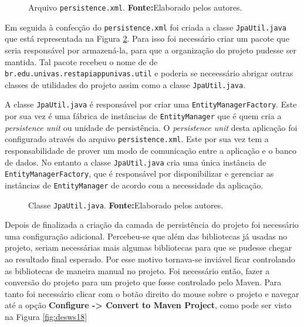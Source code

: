 	\begin{figure}[h!]
		
		\caption[Arquivo persistence.xml]{Arquivo \texttt{persistence.xml}.
		\textbf{Fonte:}Elaborado pelos autores.}
		\label{fig:desws16}
	\end{figure}
	
	\pagebreak
	
	\par Em seguida à confecção do \texttt{persistence.xml} foi criada a
classe \texttt{JpaUtil.java} que está representada na Figura \ref{fig:desws17}.
Para isso foi necessário criar um pacote que seria responsável por armazená-la,
para que a organização do projeto pudesse ser mantida. Tal pacote recebeu o nome de
de \texttt{br.edu.univas.restapiappunivas.util} e poderia se neceessário
abrigar outras classes de utilidades do projeto assim como a classe
\texttt{JpaUtil.java}.
	
	\par A classe \texttt{JpaUtil.java} é responsável por criar uma
\texttt{EntityManagerFactory}. Este por sua vez é uma  fábrica de instâncias de
\texttt{EntityManager} que é quem cria a \textit{persistence unit} ou unidade
de persistência. O \textit{persistence unit} desta aplicação foi configurado
através do arquivo \texttt{persistence.xml}. Este por sua vez tem a
responsabilidade de prover um modo de comunicação entre a aplicação e o banco
de dados. No entanto a classe \texttt{JpaUtil.java} cria uma única instância de
\texttt{EntityManagerFactory}, que é responsável por disponibilizar e gerenciar
as instâncias de \texttt{EntityManager} de acordo com a necessidade da
aplicação.
	
	\begin{figure}[h!]
		
		\caption[Classe JpaUtil.java]{Classe \texttt{JpaUtil.java}.
		\textbf{Fonte:}Elaborado pelos autores.}
		\label{fig:desws17}
	\end{figure}

	\pagebreak
	
	\par Depois de finalizada a criação da camada de persistência do projeto foi
necessário uma configuração adicional. Percebeu-se que além das bibliotecas já
usadas no projeto, seriam necessárias mais algumas bibliotecas para que se
pudesse chegar ao resultado final esperado. Por esse motivo tornava-se inviável
ficar controlando as bibliotecas de maneira manual no projeto. Foi necessário
então, fazer a conversão do projeto para um projeto que fosse controlado pelo
Maven. Para tanto foi necessário clicar com o botão direito do mouse sobre o
projeto e navegar até a opção \textbf{Configure -> Convert to Maven Project},
como pode ser visto na Figura \ref{fig:desws18}

